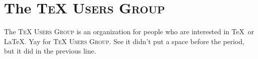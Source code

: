 \documentclass{article}
\newcommand{\TUG}{\textsc{TeX Users Group}\xspace}
\begin{document}
\section{The \TUG}
The \TUG is an organization for people who are interested in \TeX\ or \LaTeX.
Yay for \TUG. See it didn't put a space before the period, but it did in the previous line.
\end{document}
